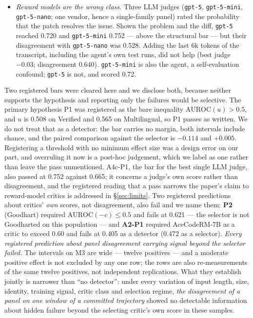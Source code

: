 \documentclass[11pt]{article}
\begin{document}
\begin{itemize}[leftmargin=1.2em,itemsep=1pt]
\item \emph{Reward models are the wrong class.} Three LLM judges (\texttt{gpt-5}, \texttt{gpt-5-mini}, \texttt{gpt-5-nano}; one vendor, hence a single-family panel) rated the probability that the patch resolves the issue. Shown the problem and the diff, \texttt{gpt-5} reached 0.720 and \texttt{gpt-5-mini} 0.752 --- above the structural bar --- but their disagreement with \texttt{gpt-5-nano} was 0.528. Adding the last 6k tokens of the transcript, including the agent's own test runs, did not help (best judge $-0.03$; disagreement 0.640). \texttt{gpt-5-mini} is also the agent, a self-evaluation confound; \texttt{gpt-5} is not, and scored 0.72.
\end{itemize}

Two registered bars were cleared here and we disclose both, because neither supports the hypothesis and reporting only the failures would be selective. The primary hypothesis P1 was registered as the bare inequality $\mathrm{AUROC}(u) > 0.5$, and $u$ is 0.508 on Verified and 0.565 on Multilingual, so P1 passes as written. We do not treat that as a detector: the bar carries no margin, both intervals include chance, and the paired comparison against the selector is $-0.114$ and $+0.005$. Registering a threshold with no minimum effect size was a design error on our part, and overruling it now is a post-hoc judgement, which we label as one rather than leave the pass unmentioned. A4c-P1, the bar for the best single LLM judge, also passed at 0.752 against 0.665; it concerns a judge's own score rather than disagreement, and the registered reading that a pass narrows the paper's claim to reward-model critics is addressed in \S\ref{sec:limits}. Two registered predictions about critics' \emph{own} scores, not disagreement, also fail and we name them: \textbf{P2} (Goodhart) required $\mathrm{AUROC}(-c)\le 0.5$ and fails at 0.621 --- the selector is not Goodharted on this population --- and \textbf{A2-P1} required AceCodeRM-7B as a critic to exceed 0.60 and fails at 0.405 as a detector (0.472 as a selector). \emph{Every registered prediction about panel disagreement carrying signal beyond the selector failed.} The intervals on M3 are wide --- twelve positives --- and a moderate positive effect is not excluded by any one row; the rows are also re-measurements of the same twelve positives, not independent replications. What they establish jointly is narrower than ``no detector'': under every variation of input length, size, identity, training signal, critic class and selection regime, \emph{the disagreement of a panel on one window of a committed trajectory} showed no detectable information about hidden failure beyond the selecting critic's own score in these samples.
\end{document}
